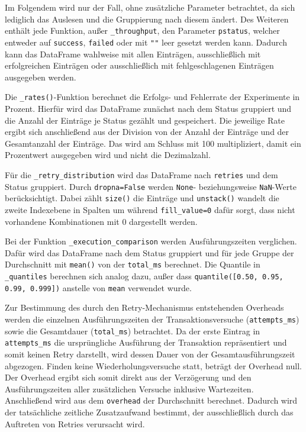 Im Folgendem wird nur der Fall, ohne zusätzliche Parameter betrachtet, da sich lediglich das Auslesen und die
Gruppierung nach diesem ändert.
Des Weiteren enthält jede Funktion, außer \texttt{\_throughput}, den Parameter \texttt{pstatus}, welcher entweder auf
\texttt{success}, \texttt{failed} oder mit \texttt{""} leer gesetzt werden kann.
Dadurch kann das DataFrame wahlweise mit allen Einträgen, ausschließlich mit erfolgreichen Einträgen oder
ausschließlich mit fehlgeschlagenen Einträgen ausgegeben werden.

Die \texttt{\_rates()}-Funktion berechnet die Erfolgs- und Fehlerrate der Experimente in Prozent.
Hierfür wird das DataFrame zunächst nach dem Status gruppiert und die Anzahl der Einträge je Status gezählt und
gespeichert.
Die jeweilige Rate ergibt sich anschließend aus der Division von der Anzahl der Einträge und der Gesamtanzahl der
Einträge.
Das wird am Schluss mit 100 multipliziert, damit ein Prozentwert ausgegeben wird und nicht die Dezimalzahl.

Für die \texttt{\_retry\_distribution} wird das DataFrame nach \texttt{retries} und dem Status gruppiert.
Durch \texttt{dropna=False} werden \texttt{None}- beziehungsweise \texttt{NaN}-Werte berücksichtigt.
Dabei zählt \texttt{size()} die Einträge und \texttt{unstack()} wandelt die zweite Indexebene in Spalten um während
\texttt{fill\_value=0} dafür sorgt, dass nicht vorhandene Kombinationen mit 0 dargestellt werden.

Bei der Funktion \texttt{\_execution\_comparison} werden Ausführungszeiten verglichen.
Dafür wird das DataFrame nach dem Status gruppiert und für jede Gruppe der Durchschnitt mit \texttt{mean()} von der
\texttt{total\_ms} berechnet.
Die Quantile in \texttt{\_quantiles} berechnen sich analog dazu, außer dass \texttt{quantile([0.50, 0.95, 0.99, 0.999])}
anstelle von \texttt{mean} verwendet wurde.

Zur Bestimmung des durch den Retry-Mechanismus entstehenden Overheads werden die einzelnen Ausführungszeiten der
Transaktionsversuche (\texttt{attempts\_ms}) sowie die Gesamtdauer (\texttt{total\_ms}) betrachtet.
Da der erste Eintrag in \texttt{attempts\_ms} die ursprüngliche Ausführung der Transaktion repräsentiert und somit
keinen Retry darstellt, wird dessen Dauer von der Gesamtausführungszeit abgezogen.
Finden keine Wiederholungsversuche statt, beträgt der Overhead null.
Der Overhead ergibt sich somit direkt aus der Verzögerung und den Ausführungszeiten aller zusätzlichen Versuche
inklusive Wartezeiten.
Anschließend wird aus dem \texttt{overhead} der Durchschnitt berechnet.
Dadurch wird der tatsächliche zeitliche Zusatzaufwand bestimmt, der ausschließlich durch das Auftreten von Retries
verursacht wird.

